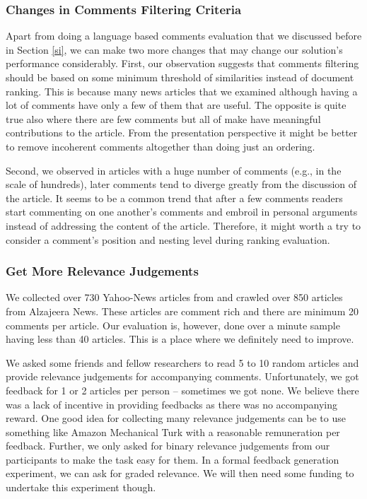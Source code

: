 \documentclass[article]{IEEEtran}
\begin{document}
\subsubsection{Changes in Comments Filtering Criteria}
Apart from doing a language based comments evaluation that we discussed before in Section \ref{si}, we can make two more changes that may change our solution's performance considerably. First, our observation suggests that comments filtering should be based on some minimum threshold of similarities instead of document ranking. This is because many news articles that we examined although having a lot of comments have only a few of them that are useful. The opposite is quite true also where there are few comments but all of make have meaningful contributions to the article. From the presentation perspective it might be better to remove incoherent comments altogether than doing just an ordering.

Second, we observed in articles with a huge number of comments (e.g., in the scale of hundreds), later comments tend to diverge greatly from the discussion of the article. It seems to be a common trend that after a few comments readers start commenting on one another's comments and embroil in personal arguments instead of addressing the content of the article. Therefore, it might worth a try to consider a comment's position and nesting level during ranking evaluation.            

\subsubsection{Get More Relevance Judgements}
We collected over 730 Yahoo-News articles from \cite{Das:2014:GBC:2556195.2556231} and crawled over 850 articles from Alzajeera News. These articles are comment rich and there are minimum 20 comments per article. Our evaluation is, however, done over a minute sample having less than 40 articles. This is a place where we definitely need to improve.  

We asked some friends and fellow researchers to read 5 to 10 random articles and provide relevance judgements for accompanying comments. Unfortunately, we got feedback for 1 or 2 articles per person -- sometimes we got none. We believe there was a lack of incentive in providing feedbacks as there was no accompanying reward. One good idea for collecting many relevance judgements can be to use something like Amazon Mechanical Turk with a reasonable remuneration per feedback. Further, we only asked for binary relevance judgements from our participants to make the task easy for them. In a formal feedback generation experiment, we can ask for graded relevance. We will then need some funding to undertake this experiment though.    
\end{document}
